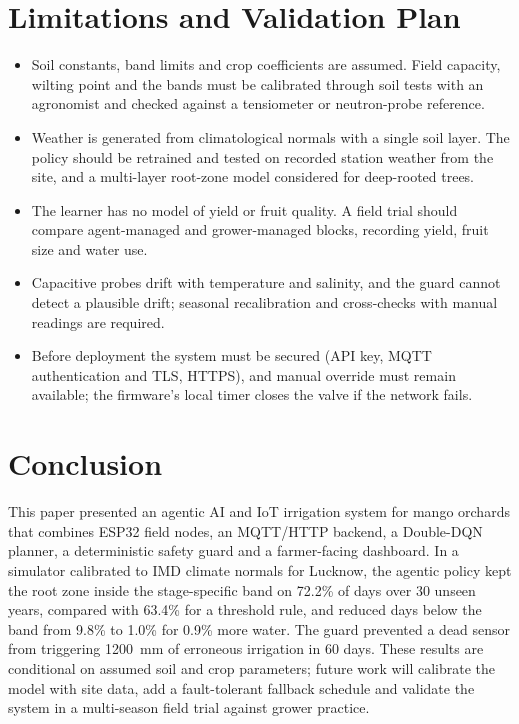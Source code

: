 \documentclass[conference]{IEEEtran}
\begin{document}
\section{Limitations and Validation Plan}
\label{sec:limits}
\begin{itemize}
\item Soil constants, band limits and crop coefficients are assumed. Field capacity, wilting point and the bands must be calibrated through soil tests with an agronomist and checked against a tensiometer or neutron-probe reference.
\item Weather is generated from climatological normals with a single soil layer. The policy should be retrained and tested on recorded station weather from the site, and a multi-layer root-zone model considered for deep-rooted trees.
\item The learner has no model of yield or fruit quality. A field trial should compare agent-managed and grower-managed blocks, recording yield, fruit size and water use.
\item Capacitive probes drift with temperature and salinity, and the guard cannot detect a plausible drift; seasonal recalibration and cross-checks with manual readings are required.
\item Before deployment the system must be secured (API key, MQTT authentication and TLS, HTTPS), and manual override must remain available; the firmware's local timer closes the valve if the network fails.
\end{itemize}

\section{Conclusion}
This paper presented an agentic AI and IoT irrigation system for mango orchards that combines ESP32 field nodes, an MQTT/HTTP backend, a Double-DQN planner, a deterministic safety guard and a farmer-facing dashboard. In a simulator calibrated to IMD climate normals for Lucknow, the agentic policy kept the root zone inside the stage-specific band on 72.2\% of days over 30 unseen years, compared with 63.4\% for a threshold rule, and reduced days below the band from 9.8\% to 1.0\% for 0.9\% more water. The guard prevented a dead sensor from triggering 1200~mm of erroneous irrigation in 60 days. These results are conditional on assumed soil and crop parameters; future work will calibrate the model with site data, add a fault-tolerant fallback schedule and validate the system in a multi-season field trial against grower practice.
\end{document}
